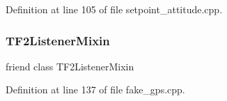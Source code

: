 Definition at line 105 of file setpoint\+\_\+attitude.\+cpp.

\mbox{\label{group__plugin_ga0eb3bbd8737231d2db969230d1d8b54b}} 
\subsubsection{\texorpdfstring{TF2ListenerMixin}{TF2ListenerMixin}\hspace{0.1cm}{\footnotesize\ttfamily [4/4]}}
{\footnotesize\ttfamily friend class T\+F2\+Listener\+Mixin\hspace{0.3cm}{\ttfamily [friend]}}



Definition at line 137 of file fake\+\_\+gps.\+cpp.

